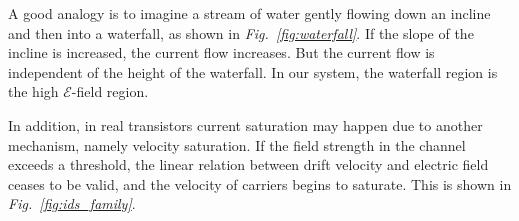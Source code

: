 A good analogy is to imagine a stream of water gently flowing down an incline and then into a waterfall, as shown in \emph{Fig.~\ref{fig:waterfall}}.  If the slope of the incline is increased, the current flow increases.  But the current flow is independent of the height of the waterfall.  In our system, the waterfall region is the high $\mathcal{E}$-field region.  

In addition, in real transistors current saturation may happen due to another mechanism, namely velocity saturation. If the field strength in the channel exceeds a threshold, the linear relation between drift velocity and electric field ceases to be valid, and the velocity of carriers begins to saturate.  This is shown in \emph{Fig.~\ref{fig:ids_family}}.
\newpage
